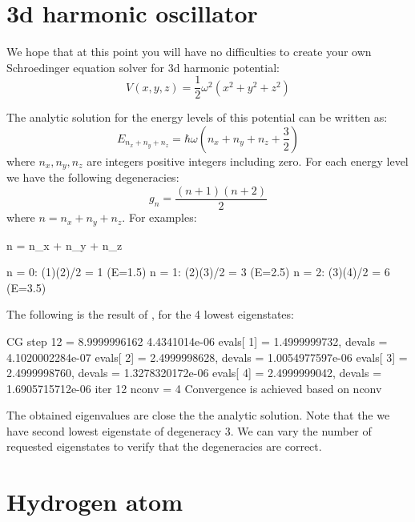 \section{3d harmonic oscillator}

We hope that at this point you will have no difficulties to create your own
Schroedinger equation solver for 3d harmonic potential:
\begin{equation}
V(x,y,z) = \frac{1}{2}\omega^2 \left( x^2 + y^2 + z^2 \right)
\end{equation}

The analytic solution for the energy levels of this potential can be written as:
\begin{equation}
E_{n_{x} + n_{y} + n_{z}} = \hbar \omega \left( n_{x} + n_{y} + n_{z} + \frac{3}{2} \right)
\end{equation}
where $n_x, n_y, n_z$ are integers positive integers including zero.
%
For each energy level we have the following degeneracies:
\begin{equation}
g_{n} = \frac{(n + 1)(n + 2)}{2}
\end{equation}
where $n = n_x + n_y + n_z$.
%
For examples:
\begin{textcode}
n = n_x + n_y + n_z

n = 0: (1)(2)/2 = 1  (E=1.5)
n = 1: (2)(3)/2 = 3  (E=2.5)
n = 2: (3)(4)/2 = 6  (E=3.5)
\end{textcode}

The following is the result of , for the 4 lowest eigenstates:
\begin{fullwidth}
\begin{textcode}
CG step       12 =       8.9999996162 4.4341014e-06
evals[  1] =       1.4999999732, devals =   4.1020002284e-07
evals[  2] =       2.4999998628, devals =   1.0054977597e-06
evals[  3] =       2.4999998760, devals =   1.3278320172e-06
evals[  4] =       2.4999999042, devals =   1.6905715712e-06
iter 12 nconv = 4
Convergence is achieved based on nconv    
\end{textcode}
\end{fullwidth}
%
The obtained eigenvalues are close the the analytic solution.
Note that the we have second lowest eigenstate of degeneracy 3.
We can vary the number of requested eigenstates to verify that the degeneracies are
correct.


\section{Hydrogen atom}

